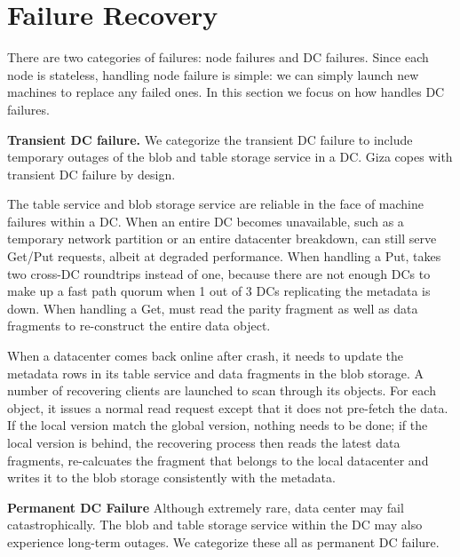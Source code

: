 \section{Failure Recovery}

There are two categories of failures: {\name} node failures and DC failures.
Since each \name node is stateless, handling node failure is simple: we can
simply launch new machines to replace any failed ones. In this section we focus
on how \name handles DC failures.

{\bf Transient DC failure.}
We categorize the transient DC failure to include temporary outages of the blob
and table storage service in a DC. Giza copes with transient DC failure by design.

The table service and blob storage service are reliable in the face of machine
failures within a DC.  When an entire DC becomes unavailable, such as a
temporary network partition or an entire datacenter breakdown, {\name} can still
serve Get/Put requests, albeit at degraded performance. When handling a Put,
\name takes two cross-DC roundtrips instead of one, because there are not enough
DCs to make up a fast path quorum when 1 out of 3 DCs replicating the metadata
is down. When handling a Get, \name must read the parity fragment as well as
data fragments to re-construct the entire data object.

When a datacenter comes back online after crash, it needs to update the metadata
rows in its table service and data fragments in the blob storage. A number of
recovering clients are launched to scan through its objects. For each object, it
issues a normal read request except that it does not pre-fetch the data. If the
local version match the global version, nothing needs to be done; if the local
version is behind, the recovering process then reads the latest data fragments,
re-calcuates the fragment that belongs to the local datacenter and writes it to
the blob storage consistently with the metadata.

{\bf Permanent DC Failure}
Although extremely rare, data center may fail catastrophically. The blob and
table storage service within the DC may also experience long-term outages. We
categorize these all as permanent DC failure. 

